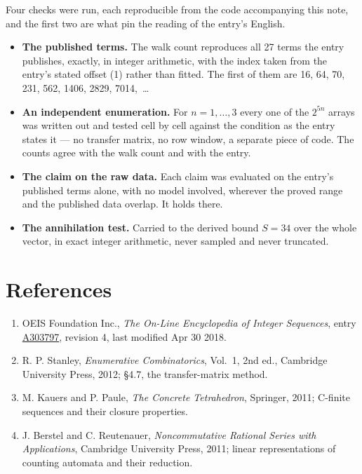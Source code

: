 \documentclass[11pt]{article}
\theoremstyle{definition}
\begin{document}
Four checks were run, each reproducible from the code accompanying this note, and the first two are what pin the reading of the entry's English.

\begin{itemize}

\item {\bfseries The published terms.} The walk count reproduces all 27 terms the entry publishes, exactly, in integer arithmetic, with the index taken from the entry's stated offset (1) rather than fitted. The first of them are 16, 64, 70, 231, 562, 1406, 2829, 7014,~\dots

\item {\bfseries An independent enumeration.} For $n = 1,\dots,3$ every one of the $2^{5n}$ arrays was written out and tested cell by cell against the condition as the entry states it --- no transfer matrix, no row window, a separate piece of code. The counts agree with the walk count and with the entry.

\item {\bfseries The claim on the raw data.} Each claim was evaluated on the entry's published terms alone, with no model involved, wherever the proved range and the published data overlap. It holds there.

\item {\bfseries The annihilation test.} Carried to the derived bound $S = 34$ over the whole vector, in exact integer arithmetic, never sampled and never truncated.

\end{itemize}

\section{References}

\begin{enumerate}

\item OEIS Foundation Inc., \emph{The On-Line Encyclopedia of Integer Sequences}, entry \href{https://oeis.org/A303797}{A303797}, revision 4, last modified Apr 30 2018.

\item R. P. Stanley, \emph{Enumerative Combinatorics}, Vol.~1, 2nd ed., Cambridge University Press, 2012; \S4.7, the transfer-matrix method.

\item M. Kauers and P. Paule, \emph{The Concrete Tetrahedron}, Springer, 2011; C-finite sequences and their closure properties.

\item J. Berstel and C. Reutenauer, \emph{Noncommutative Rational Series with Applications}, Cambridge University Press, 2011; linear representations of counting automata and their reduction.

\end{enumerate}
\end{document}
